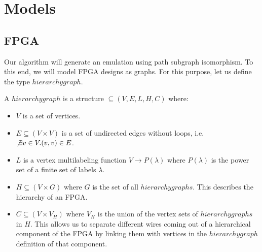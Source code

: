\section{Models}
\subsection{FPGA}
Our algorithm will generate an emulation using path subgraph isomorphism. To this end, we will model FPGA designs as graphs. For this purpose, let us define the type $hierarchygraph$.


\begin{defn}
A $hierarchygraph$ is a structure $\subseteq (V, E, L, H, C)$ where:

\begin{itemize}
\item $V$ is a set of vertices.
\item $E\subseteq (V \times V)$ is a set of undirected edges without loops, i.e. $\not \exists v \in V . (v, v) \in E$.
\item $L$ is a vertex multilabeling function $V \to P(\lambda)$ where $P(\lambda)$ is the power set of a finite set of labels $\lambda$.
\item $H \subseteq(V \times G)$ where $G$ is the set of all $hierarchygraphs$. This describes the hierarchy of an FPGA.
\item $C \subseteq (V \times V_H)$ where $V_H$ is the union of the vertex sets of $hierarchygraphs$ in $H$. This allows us to separate different wires coming out of a hierarchical component of the FPGA by linking them with vertices in the $hierarchygraph$ definition of that component.
\end{itemize}
\end{defn}


